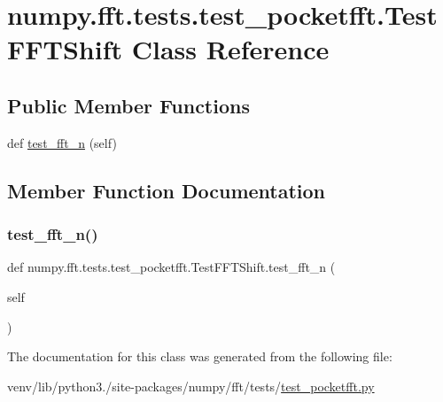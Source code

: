 \hypertarget{classnumpy_1_1fft_1_1tests_1_1test__pocketfft_1_1TestFFTShift}{}\section{numpy.\+fft.\+tests.\+test\+\_\+pocketfft.\+Test\+F\+F\+T\+Shift Class Reference}
\label{classnumpy_1_1fft_1_1tests_1_1test__pocketfft_1_1TestFFTShift}
\subsection*{Public Member Functions}
\begin{DoxyCompactItemize}
\item 
def \hyperlink{classnumpy_1_1fft_1_1tests_1_1test__pocketfft_1_1TestFFTShift_afa42d0863990d65348e5d10c203bf81a}{test\+\_\+fft\+\_\+n} (self)
\end{DoxyCompactItemize}


\subsection{Member Function Documentation}
\mbox{\label{classnumpy_1_1fft_1_1tests_1_1test__pocketfft_1_1TestFFTShift_afa42d0863990d65348e5d10c203bf81a}} 
\subsubsection{\texorpdfstring{test\+\_\+fft\+\_\+n()}{test\_fft\_n()}}
{\footnotesize\ttfamily def numpy.\+fft.\+tests.\+test\+\_\+pocketfft.\+Test\+F\+F\+T\+Shift.\+test\+\_\+fft\+\_\+n (\begin{DoxyParamCaption}\item[{}]{self }\end{DoxyParamCaption})}



The documentation for this class was generated from the following file\+:\begin{DoxyCompactItemize}
\item 
venv/lib/python3./site-\/packages/numpy/fft/tests/\hyperlink{test__pocketfft_8py}{test\+\_\+pocketfft.\+py}\end{DoxyCompactItemize}
